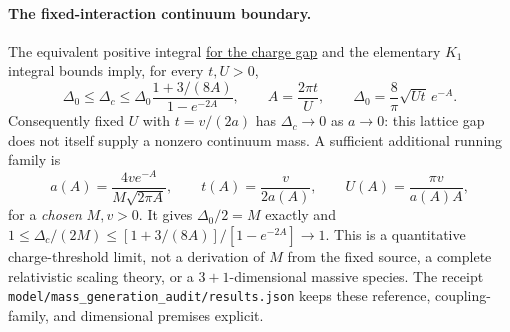 \paragraph{The fixed-interaction continuum boundary.}
The equivalent positive integral
\href{https://arxiv.org/html/cond-mat/9911281}{for the charge gap} and
the elementary $K_1$ integral bounds imply, for every $t,U>0$,
\[
 \Delta_0\le\Delta_c\le
 \Delta_0\frac{1+3/(8A)}{1-e^{-2A}},\qquad
 A=\frac{2\pi t}{U},\qquad
 \Delta_0=\frac8\pi\sqrt{Ut}\,e^{-A}.
\]
Consequently fixed $U$ with $t=v/(2a)$ has
$\Delta_c\to0$ as $a\to0$: this lattice gap does not itself supply a
nonzero continuum mass.  A sufficient additional running family is
\[
 a(A)=\frac{4v e^{-A}}{M\sqrt{2\pi A}},\qquad
 t(A)=\frac{v}{2a(A)},\qquad U(A)=\frac{\pi v}{a(A)A},
\]
for a \emph{chosen} $M,v>0$.  It gives $\Delta_0/2=M$ exactly and
$1\le\Delta_c/(2M)\le[1+3/(8A)]/[1-e^{-2A}]\to1$.
This is a quantitative charge-threshold limit, not a derivation of $M$
from the fixed source, a complete relativistic scaling theory, or a
$3+1$-dimensional massive species.  The receipt
\texttt{model/mass\_generation\_audit/results.json} keeps these reference,
coupling-family, and dimensional premises explicit.
